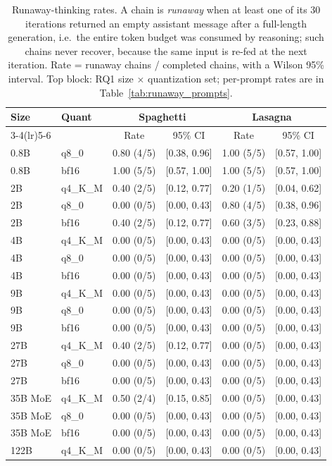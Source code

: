 \begin{table}[p]
\centering
\caption{Runaway-thinking rates. A chain is \emph{runaway} when at
  least one of its 30 iterations returned an empty assistant message
  after a full-length generation, i.e.\ the entire token budget was
  consumed by reasoning; such chains never recover, because the same
  input is re-fed at the next iteration. Rate = runaway chains /
  completed chains, with a Wilson 95\% interval. Top block: RQ1 size
  $\times$ quantization set; per-prompt rates are in Table~\ref{tab:runaway_prompts}.}
\label{tab:runaway}
\footnotesize
\begin{tabular}{llcccc}
\toprule
Size & Quant & \multicolumn{2}{c}{Spaghetti} & \multicolumn{2}{c}{Lasagna} \\
\cmidrule(lr){3-4}\cmidrule(lr){5-6}
 & & Rate & 95\% CI & Rate & 95\% CI \\
\midrule
0.8B & q8\_0 & 0.80 (4/5) & [0.38, 0.96] & 1.00 (5/5) & [0.57, 1.00] \\
0.8B & bf16 & 1.00 (5/5) & [0.57, 1.00] & 1.00 (5/5) & [0.57, 1.00] \\
2B & q4\_K\_M & 0.40 (2/5) & [0.12, 0.77] & 0.20 (1/5) & [0.04, 0.62] \\
2B & q8\_0 & 0.00 (0/5) & [0.00, 0.43] & 0.80 (4/5) & [0.38, 0.96] \\
2B & bf16 & 0.40 (2/5) & [0.12, 0.77] & 0.60 (3/5) & [0.23, 0.88] \\
4B & q4\_K\_M & 0.00 (0/5) & [0.00, 0.43] & 0.00 (0/5) & [0.00, 0.43] \\
4B & q8\_0 & 0.00 (0/5) & [0.00, 0.43] & 0.00 (0/5) & [0.00, 0.43] \\
4B & bf16 & 0.00 (0/5) & [0.00, 0.43] & 0.00 (0/5) & [0.00, 0.43] \\
9B & q4\_K\_M & 0.00 (0/5) & [0.00, 0.43] & 0.00 (0/5) & [0.00, 0.43] \\
9B & q8\_0 & 0.00 (0/5) & [0.00, 0.43] & 0.00 (0/5) & [0.00, 0.43] \\
9B & bf16 & 0.00 (0/5) & [0.00, 0.43] & 0.00 (0/5) & [0.00, 0.43] \\
27B & q4\_K\_M & 0.40 (2/5) & [0.12, 0.77] & 0.00 (0/5) & [0.00, 0.43] \\
27B & q8\_0 & 0.00 (0/5) & [0.00, 0.43] & 0.00 (0/5) & [0.00, 0.43] \\
27B & bf16 & 0.00 (0/5) & [0.00, 0.43] & 0.00 (0/5) & [0.00, 0.43] \\
35B MoE & q4\_K\_M & 0.50 (2/4) & [0.15, 0.85] & 0.00 (0/5) & [0.00, 0.43] \\
35B MoE & q8\_0 & 0.00 (0/5) & [0.00, 0.43] & 0.00 (0/5) & [0.00, 0.43] \\
35B MoE & bf16 & 0.00 (0/5) & [0.00, 0.43] & 0.00 (0/5) & [0.00, 0.43] \\
122B & q4\_K\_M & 0.00 (0/5) & [0.00, 0.43] & 0.00 (0/5) & [0.00, 0.43] \\
\bottomrule
\end{tabular}

\end{table}


